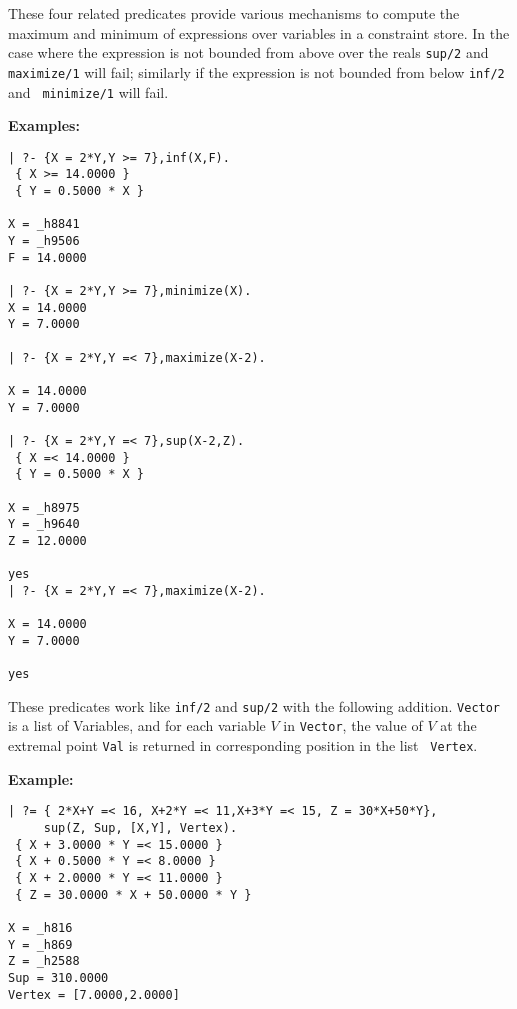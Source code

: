 \begin{description}

%
These four related predicates provide various mechanisms to compute
the maximum and minimum of expressions over variables in a constraint
store.  In the case where the expression is not bounded from above
over the reals {\tt sup/2} and {\tt maximize/1} will fail; similarly
if the expression is not bounded from below {\tt inf/2} and {\tt
minimize/1} will fail.

{\bf Examples:}
{\small
\begin{verbatim}
| ?- {X = 2*Y,Y >= 7},inf(X,F).
 { X >= 14.0000 }
 { Y = 0.5000 * X }

X = _h8841
Y = _h9506
F = 14.0000

| ?- {X = 2*Y,Y >= 7},minimize(X).
X = 14.0000
Y = 7.0000

| ?- {X = 2*Y,Y =< 7},maximize(X-2).

X = 14.0000
Y = 7.0000

| ?- {X = 2*Y,Y =< 7},sup(X-2,Z).
 { X =< 14.0000 }
 { Y = 0.5000 * X }

X = _h8975
Y = _h9640
Z = 12.0000

yes
| ?- {X = 2*Y,Y =< 7},maximize(X-2).

X = 14.0000
Y = 7.0000

yes
\end{verbatim}
}


%
These predicates work like {\tt inf/2} and {\tt sup/2} with the
following addition.  {\tt Vector} is a list of Variables, and for each
variable $V$ in {\tt Vector}, the value of $V$ at the extremal point
{\tt Val} is returned in corresponding position in the list {\tt
  Vertex}.

{\bf Example:}
{\small 
\begin{verbatim}
| ?= { 2*X+Y =< 16, X+2*Y =< 11,X+3*Y =< 15, Z = 30*X+50*Y},
     sup(Z, Sup, [X,Y], Vertex).
 { X + 3.0000 * Y =< 15.0000 }
 { X + 0.5000 * Y =< 8.0000 }
 { X + 2.0000 * Y =< 11.0000 }
 { Z = 30.0000 * X + 50.0000 * Y }

X = _h816
Y = _h869
Z = _h2588
Sup = 310.0000
Vertex = [7.0000,2.0000]
\end{verbatim}
}



\end{description}
